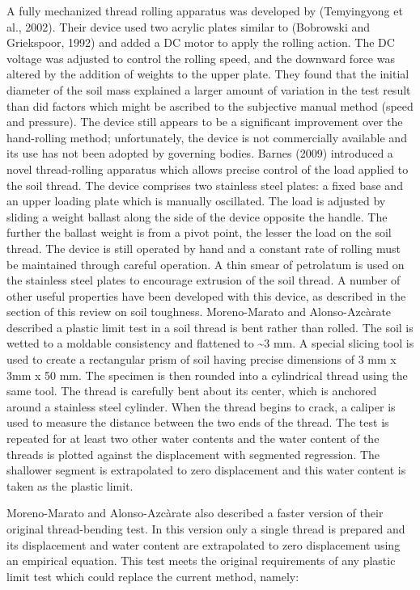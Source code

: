 \documentclass[
]{book}
\begin{document}
A fully mechanized thread rolling apparatus was developed by (Temyingyong et al., 2002). Their device used two acrylic plates similar to (Bobrowski and Griekspoor, 1992) and added a DC motor to apply the rolling action. The DC voltage was adjusted to control the rolling speed, and the downward force was altered by the addition of weights to the upper plate. They found that the initial diameter of the soil mass explained a larger amount of variation in the test result than did factors which might be ascribed to the subjective manual method (speed and pressure). The device still appears to be a significant improvement over the hand-rolling method; unfortunately, the device is not commercially available and its use has not been adopted by governing bodies.
Barnes (2009) introduced a novel thread-rolling apparatus which allows precise control of the load applied to the soil thread. The device comprises two stainless steel plates: a fixed base and an upper loading plate which is manually oscillated. The load is adjusted by sliding a weight ballast along the side of the device opposite the handle. The further the ballast weight is from a pivot point, the lesser the load on the soil thread. The device is still operated by hand and a constant rate of rolling must be maintained through careful operation. A thin smear of petrolatum is used on the stainless steel plates to encourage extrusion of the soil thread. A number of other useful properties have been developed with this device, as described in the section of this review on soil toughness.
Moreno-Marato and Alonso-Azcàrate described a plastic limit test in a soil thread is bent rather than rolled. The soil is wetted to a moldable consistency and flattened to \textasciitilde3 mm. A special slicing tool is used to create a rectangular prism of soil having precise dimensions of 3 mm x 3mm x 50 mm. The specimen is then rounded into a cylindrical thread using the same tool. The thread is carefully bent about its center, which is anchored around a stainless steel cylinder. When the thread begins to crack, a caliper is used to measure the distance between the two ends of the thread. The test is repeated for at least two other water contents and the water content of the threads is plotted against the displacement with segmented regression. The shallower segment is extrapolated to zero displacement and this water content is taken as the plastic limit.

Moreno-Marato and Alonso-Azcàrate also described a faster version of their original thread-bending test. In this version only a single thread is prepared and its displacement and water content are extrapolated to zero displacement using an empirical equation. This test meets the original requirements of any plastic limit test which could replace the current method, namely:
\end{document}
